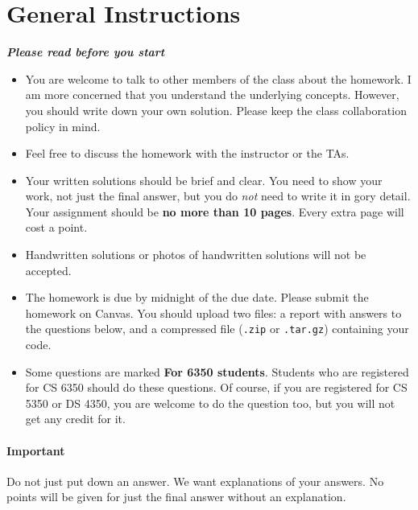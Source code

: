 
\section*{General Instructions}
\begin{center}
\textbf{\emph{Please read before you start}}
\end{center}


{\footnotesize
  \begin{itemize}
  \item You are welcome to talk to other members of the class about the
    homework. I am more concerned that you understand the underlying
    concepts. However, you should write down your own solution. Please keep the
    class collaboration policy in mind.

  \item Feel free to discuss the homework with the instructor or the TAs.

  \item Your written solutions should be brief and clear. You need to show your
    work, not just the final answer, but you do \emph{not} need to write it in
    gory detail. Your assignment should be {\bf no more than 10 pages}. Every
    extra page will cost a point.

  \item Handwritten solutions or photos of handwritten solutions will not be accepted. 

  \item The homework is due by midnight of the due date. Please submit the
    homework on Canvas. You should upload two files: a report with answers to
    the questions below, and a compressed file (\texttt{.zip} or
    \texttt{.tar.gz}) containing your code.

  \item Some questions are marked {\bf For 6350 students}. Students who are
    registered for CS 6350 should do these questions. Of course, if you are
    registered for CS 5350 or DS 4350, you are welcome to do the question too,
    but you will not get any credit for it.

  \end{itemize}

  \paragraph{Important} Do not just put down an answer. We want 
  explanations of your answers. No points will be given for just the final answer
  without an explanation.



}


